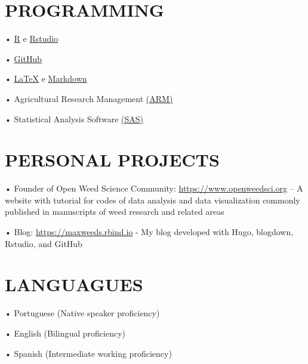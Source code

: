 \documentclass[11pt,]{article}
\begin{document}
\hypertarget{programming}{%
\section{PROGRAMMING}\label{programming}}

• \href{https://www.r-project.org}{R} e
\href{https://www.rstudio.com}{Rstudio}

• \href{https://github.com}{GitHub}

• \href{https://latex.org}{LaTeX} e
\href{https://www.markdownguide.org}{Markdown}

• Agricultural Research Management
\href{https://www.arm.com/products/development-tools}{(ARM)}

• Statistical Analysis Software \href{https://www.sas.com/}{(SAS)}

\hypertarget{personal-projects}{%
\section{PERSONAL PROJECTS}\label{personal-projects}}

• Founder of Open Weed Science Community:
\url{https://www.openweedsci.org} -- A website with tutorial for codes
of data analysis and data visualization commonly published in
manuscripts of weed research and related areas

• Blog: \url{https://maxweeds.rbind.io} - My blog developed with Hugo,
blogdown, Rstudio, and GitHub

\hypertarget{languagues}{%
\section{LANGUAGUES}\label{languagues}}

• Portuguese (Native speaker proficiency)

• English (Bilingual proficiency)

• Spanish (Intermediate working proficiency)
\end{document}
